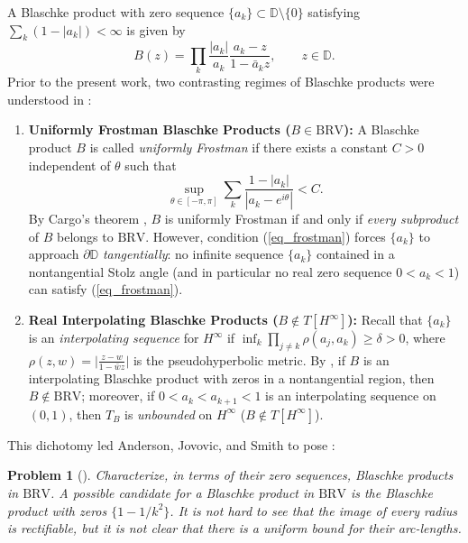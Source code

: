 \documentclass[11pt,reqno]{amsart}
\newtheorem{prob}[thm]{Problem}
\numberwithin{equation}{section}
\newcommand{\D}{\mathbb{D}}
\newcommand{\BRV}{\mathrm{BRV}}
\begin{document}
A Blaschke product with zero sequence $\{a_k\} \subset \D \setminus \{0\}$ satisfying $\sum_k (1 - |a_k|) < \infty$ is given by
\[
  B(z) = \prod_k \frac{|a_k|}{a_k} \frac{a_k - z}{1 - \bar{a}_k z}, \qquad z \in \D.
\]
Prior to the present work, two contrasting regimes of Blaschke products were understood in \cite{AJS14}:
\begin{enumerate}
\item \textbf{Uniformly Frostman Blaschke Products ($B \in \BRV$):} A Blaschke product $B$ is called \emph{uniformly Frostman} \cite[Eq.~(2.2)]{AJS14} if there exists a constant $C > 0$ independent of $\theta$ such that
\begin{equation} \label{eq_frostman}
  \sup_{\theta \in [-\pi, \pi]} \sum_k \frac{1 - |a_k|}{|a_k - e^{i\theta}|} < C.
\end{equation}
By Cargo's theorem \cite[Theorem~1]{Car61}, $B$ is uniformly Frostman if and only if \emph{every subproduct} of $B$ belongs to $\BRV$. However, condition (\ref{eq_frostman}) forces $\{a_k\}$ to approach $\partial\D$ \emph{tangentially}: no infinite sequence $\{a_k\}$ contained in a nontangential Stolz angle (and in particular no real zero sequence $0 < a_k < 1$) can satisfy (\ref{eq_frostman}).
\item \textbf{Real Interpolating Blaschke Products ($B \notin T[H^\infty]$):} Recall that $\{a_k\}$ is an \emph{interpolating sequence} for $H^\infty$ if $\inf_k \prod_{j \ne k} \rho(a_j, a_k) \ge \delta > 0$, where $\rho(z, w) = \bigl|\frac{z - w}{1 - \bar{w} z}\bigr|$ is the pseudohyperbolic metric. By \cite[Proposition~2.7 and Theorem~2.10]{AJS14}, if $B$ is an interpolating Blaschke product with zeros in a nontangential region, then $B \notin \BRV$; moreover, if $0 < a_k < a_{k+1} < 1$ is an interpolating sequence on $(0, 1)$, then $T_B$ is \emph{unbounded} on $H^\infty$ ($B \notin T[H^\infty]$).
\end{enumerate}

This dichotomy led Anderson, Jovovic, and Smith to pose \cite[Problem~4.3, p.~14]{AJS14}:
\begin{prob}[{\cite[Problem~4.3]{AJS14}}] \label{prob_4_3}
Characterize, in terms of their zero sequences, Blaschke products in $\BRV$. A possible candidate for a Blaschke product in $\BRV$ is the Blaschke product with zeros $\{1 - 1/k^2\}$. It is not hard to see that the image of every radius is rectifiable, but it is not clear that there is a uniform bound for their arc-lengths.
\end{prob}
\end{document}
